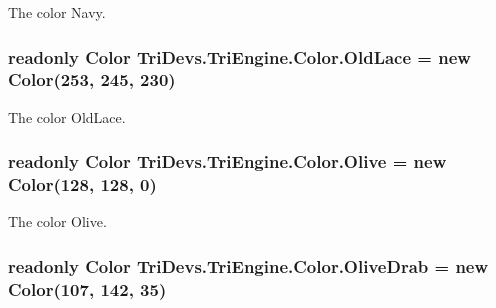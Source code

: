 The color Navy. 

\hypertarget{struct_tri_devs_1_1_tri_engine_1_1_color_ad00eb6d4c15ee1b07cabe6aa7f8258be}{
\subsubsection[{Old\-Lace}]{\setlength{\rightskip}{0pt plus 5cm}readonly {\bf Color} Tri\-Devs.\-Tri\-Engine.\-Color.\-Old\-Lace = new {\bf Color}(253, 245, 230)\hspace{0.3cm}{\ttfamily [static]}}}\label{struct_tri_devs_1_1_tri_engine_1_1_color_ad00eb6d4c15ee1b07cabe6aa7f8258be}


The color Old\-Lace. 

\hypertarget{struct_tri_devs_1_1_tri_engine_1_1_color_a2287c129b1d4d161e05c072480abe02d}{
\subsubsection[{Olive}]{\setlength{\rightskip}{0pt plus 5cm}readonly {\bf Color} Tri\-Devs.\-Tri\-Engine.\-Color.\-Olive = new {\bf Color}(128, 128, 0)\hspace{0.3cm}{\ttfamily [static]}}}\label{struct_tri_devs_1_1_tri_engine_1_1_color_a2287c129b1d4d161e05c072480abe02d}


The color Olive. 

\hypertarget{struct_tri_devs_1_1_tri_engine_1_1_color_a7486e2ac75e8ad49403df9d9424479a5}{
\subsubsection[{Olive\-Drab}]{\setlength{\rightskip}{0pt plus 5cm}readonly {\bf Color} Tri\-Devs.\-Tri\-Engine.\-Color.\-Olive\-Drab = new {\bf Color}(107, 142, 35)\hspace{0.3cm}{\ttfamily [static]}}}\label{struct_tri_devs_1_1_tri_engine_1_1_color_a7486e2ac75e8ad49403df9d9424479a5}


